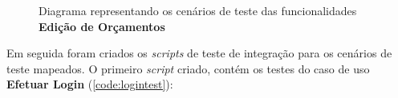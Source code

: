             \begin{figure}[!htb]
                \centering
	            \begin{minipage}{\wd0}
            		\caption{Diagrama representando os cenários de teste das funcionalidades \textbf{Edição de Orçamentos}}
		            \label{fig:testing-mind-map-orcamentos-edicao}
	            \end{minipage}
            \end{figure}

    Em seguida foram criados os \emph{scripts} de teste de integração para os cenários de teste mapeados. O primeiro \emph{script} criado, contém os testes do caso de uso \textbf{Efetuar Login} (\autoref{code:logintest}):
        
